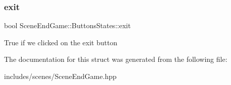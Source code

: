 \subsubsection{\texorpdfstring{exit}{exit}}
{\footnotesize\ttfamily bool Scene\+End\+Game\+::\+Buttons\+States\+::exit}

True if we clicked on the exit button 

The documentation for this struct was generated from the following file\+:\begin{DoxyCompactItemize}
\item 
includes/scenes/Scene\+End\+Game.\+hpp\end{DoxyCompactItemize}
